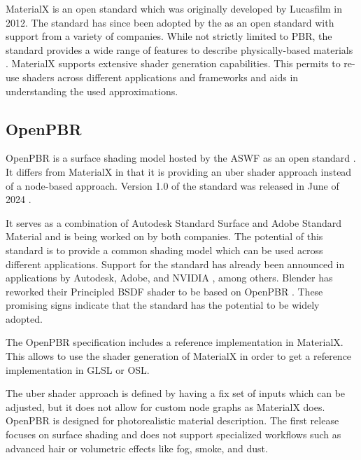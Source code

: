 \gls{MaterialX} is an open standard which was originally developed by Lucasfilm in 2012. The standard has since been adopted by the  as an open standard with support from a variety of companies. While not strictly limited to \gls{PBR}, the standard provides a wide range of features to describe physically-based materials \cite{Harrysson2019}. \gls{MaterialX} supports extensive shader generation capabilities. This permits to re-use shaders across different applications and frameworks and aids in understanding the used approximations.

\subsection*{OpenPBR}

\gls{OpenPBR} is a surface shading model hosted by the \gls{ASWF} as an open standard \cite{openPBRSpec}. It differs from \gls{MaterialX} in that it is providing an \gls{uber shader} approach instead of a node-based approach. Version 1.0 of the standard was released in June of 2024 \cite{openPBR1Dot0Release}.

It serves as a combination of Autodesk Standard Surface and Adobe Standard Material and is being worked on by both companies. The potential of this standard is to provide a common shading model which can be used across different applications. Support for the standard has already been announced in applications by Autodesk, Adobe, and NVIDIA \cite{omniverseOpenPBR}, among others. \gls{Blender} has reworked their Principled \gls{BSDF} shader to be based on \gls{OpenPBR} \cite{blenderOpenPBRInspiration}. These promising signs indicate that the standard has the potential to be widely adopted.

The \gls{OpenPBR} specification includes a reference implementation in \gls{MaterialX}. This allows to use the shader generation of \gls{MaterialX} in order to get a reference implementation in \gls{GLSL} or \gls{OSL}.

The \gls{uber shader} approach is defined by having a fix set of inputs which can be adjusted, but it does not allow for custom node graphs as \gls{MaterialX} does. \gls{OpenPBR} is designed for photorealistic material description. The first release focuses on surface shading and does not support specialized workflows such as advanced hair or volumetric effects like fog, smoke, and dust.

